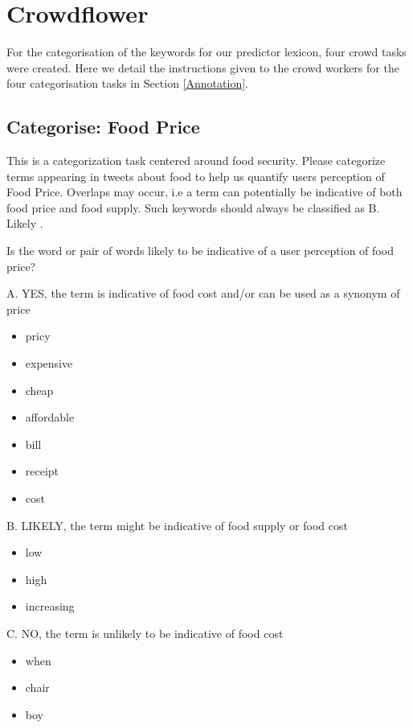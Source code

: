 \chapter{Crowdflower}
\label{crowd_task}


For the categorisation of the keywords for our predictor lexicon, four crowd tasks were created. Here we detail the instructions given to the crowd workers for the four categorisation tasks in Section \ref{Annotation}. 

\section{Categorise: Food Price}

This is a categorization task centered around food security. Please categorize terms appearing in tweets about food to help us quantify users perception of Food Price. Overlaps may occur, i.e a term can potentially be indicative of both food price and food supply. Such keywords should always be classified as B. Likely .

Is the word or pair of words likely to be indicative of a user perception of food price?

A. YES, the term is indicative of food cost and/or can be used as a synonym of price

\begin{itemize}

  \item pricy 
  \item expensive 
  \item cheap 
  \item affordable 
  \item bill 
  \item receipt 
  \item cost 
\end{itemize}


B. LIKELY, the term might be indicative of food supply or food cost
\begin{itemize}
  \item low
  \item high 
  \item increasing 
\end{itemize}


C. NO, the term is unlikely to be indicative of food cost 
\begin{itemize}
  \item when
  \item chair
  \item boy
\end{itemize}


